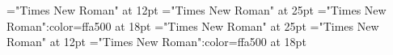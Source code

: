 \documentclass[a4paper]{article}
\begin{document}
 
\pagestyle{plain} 
\font\div="Times New Roman" at 12pt
\font{}="Times New Roman" at 25pt
\font{}="Times New Roman":color=ffa500 at 18pt
\font\entryletHeaddiv="Times New Roman" at 25pt
\font{}="Times New Roman" at 12pt
\font{}="Times New Roman":color=ffa500 at 18pt

\pagestyle{fancy} 


\end{document}
